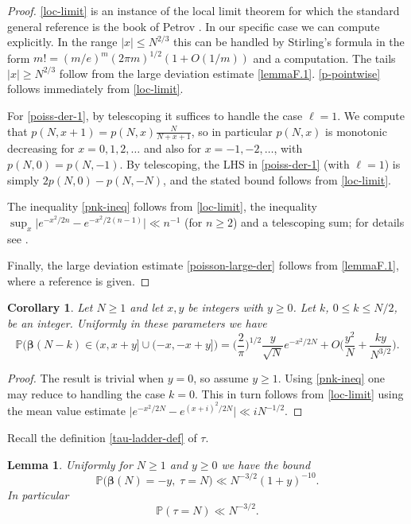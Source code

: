 \documentclass[11pt,reqno]{amsart}
\numberwithin{equation}{section}
\newtheorem{lemma}[theorem]{Lemma}
\newtheorem{corollary}[theorem]{Corollary}
\theoremstyle{definition}
\theoremstyle{remark}
\newcommand{\mb}{\mathbb}
\def\boldbeta{\boldsymbol\beta}
\renewcommand{\le}{\leqslant}
\renewcommand{\ge}{\geqslant}
\begin{document}
\begin{proof}
\cref{loc-limit} is an instance of the local limit theorem for which the standard general reference is the book of Petrov \cite{petrov}. In our specific case we can compute explicitly. In the range $|x| \le N^{2/3}$ this can be handled by Stirling's formula in the form $m! = (m/e)^m(2\pi m)^{1/2}(1 + O(1/m))$ and a computation. The tails $|x| \ge N^{2/3}$ follow from the large deviation estimate \cref{lemmaF.1}.  \cref{p-pointwise} follows immediately from \cref{loc-limit}.

For \cref{poiss-der-1}, by telescoping it suffices to handle the case $\ell = 1$. We compute that $p(N,x + 1) = p(N, x) \frac{N}{N + x + 1}$, so in particular $p(N,x)$ is monotonic decreasing for $x = 0,1,2,\dots$ and also for $x = -1,-2,\dots$, with $p(N,0) = p(N, -1)$. By telescoping, the LHS in \cref{poiss-der-1} (with $\ell = 1$) is simply $2 p(N,0) - p(N, -N)$, and the stated bound follows from \cref{loc-limit}.

The inequality \cref{pnk-ineq} follows from \cref{loc-limit}, the inequality $\sup_x \big| e^{-x^2/2n} - e^{-x^2/2(n - 1)}\big| \ll n^{-1}$ (for $n \ge 2$) and a telescoping sum; for details see \cite[Equation (32)]{DTW-berry-esseen}.

Finally, the large deviation estimate \cref{poisson-large-der} follows from \cref{lemmaF.1}, where a reference is given.
\end{proof}
\begin{corollary}\label{probs-cor}
Let $N \ge 1$ and let $x, y$ be integers with $y \ge 0$. Let $k$, $0 \le k \le N/2$, be an integer. Uniformly in these parameters we have
    \[ \mb{P}\big(\boldbeta(N - k) \in (x, x + y] \cup (-x, -x + y]\big) = \big(\frac{2}{\pi}\big)^{1/2} \frac{y}{\sqrt{N}} e^{-x^2/2N} + O\big( \frac{y^2}{N} + \frac{ky}{N^{3/2}}\big).\]
\end{corollary}
\begin{proof} The result is trivial when $y = 0$, so assume $y \ge 1$. Using \cref{pnk-ineq} one may reduce to handling the case $k = 0$. This in turn follows from \cref{loc-limit} using the mean value estimate $\big|e^{-x^2/2N} - e^{(x+i)^2/2N}\big| \ll i N^{-1/2}$.
\end{proof}
Recall the definition \cref{tau-ladder-def} of $\tau$.
\begin{lemma}
Uniformly for $N \ge 1$ and $y \ge 0$ we have the bound
\begin{equation}\label{last-step} \mb{P}\big(\boldbeta(N) = - y, \; \tau = N\big) \ll N^{-3/2} (1 + y)^{-10}.\end{equation}   
    In particular
    \begin{equation}\label{tau-pointwise} \mb{P}(\tau = N) \ll N^{-3/2}.\end{equation}
\end{lemma}
\end{document}
